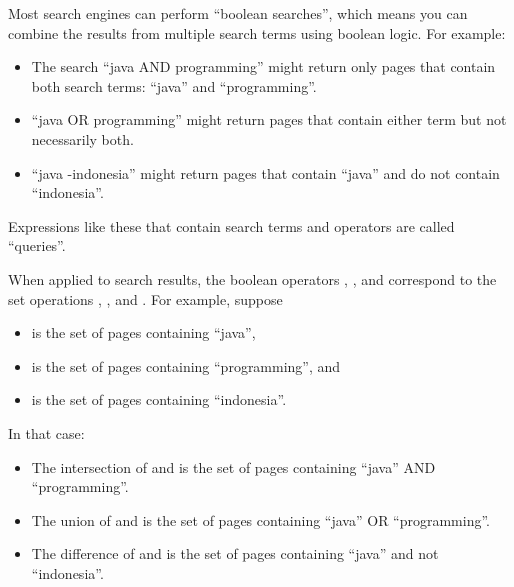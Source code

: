 \documentclass[12pt]{book}
\theoremstyle{exercise}
\begin{document}
Most search engines can perform ``boolean searches'', which means you
can combine the results from multiple search terms using boolean logic.
For example:

\begin{itemize}

\item
  The search ``java AND programming'' might return only pages that
  contain both search terms: ``java'' and ``programming''.

\item
  ``java OR programming'' might return pages that contain either term
  but not necessarily both.

\item
  ``java -indonesia'' might return pages that contain ``java'' and do
  not contain ``indonesia''.

\end{itemize}

Expressions like these that contain search terms and operators are
called ``queries''.


When applied to search results, the boolean operators ,
, and \java{-} correspond to the set operations
, , and . For
example, suppose

\begin{itemize}

\item
   is the set of pages containing ``java'',

\item
   is the set of pages containing ``programming'', and

\item
   is the set of pages containing ``indonesia''.

\end{itemize}

In that case:

\begin{itemize}

\item
  The intersection of  and  is the set of pages
  containing ``java'' AND ``programming''.

\item
  The union of  and  is the set of pages
  containing ``java'' OR ``programming''.

\item
  The difference of  and  is the set of pages
  containing ``java'' and not ``indonesia''.
\end{itemize}
\end{document}
